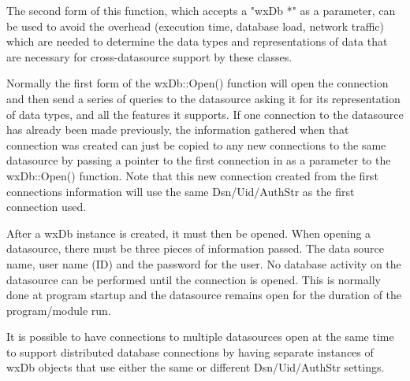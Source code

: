 The second form of this function, which accepts a "wxDb *" as a parameter,
can be used to avoid the overhead (execution time, database load, network
traffic) which are needed to determine the data types and representations
of data that are necessary for cross-datasource support by these classes.

Normally the first form of the wxDb::Open() function will open the connection
and then send a series of queries to the datasource asking it for its
representation of data types, and all the features it supports.  If one
connection to the datasource has already been made previously, the information
gathered when that connection was created can just be copied to any new
connections to the same datasource by passing a pointer to the first
connection in as a parameter to the wxDb::Open() function.  Note that this
new connection created from the first connections information will use the
same Dsn/Uid/AuthStr as the first connection used.




After a wxDb instance is created, it must then be opened.  When opening a
datasource, there must be three pieces of information passed.  The data
source name, user name (ID) and the password for the user.  No database
activity on the datasource can be performed until the connection is opened.
This is normally done at program startup and the datasource remains
open for the duration of the program/module run.

It is possible to have connections to multiple datasources open at the same
time to support distributed database connections by having separate instances
of wxDb objects that use either the same or different Dsn/Uid/AuthStr settings.

